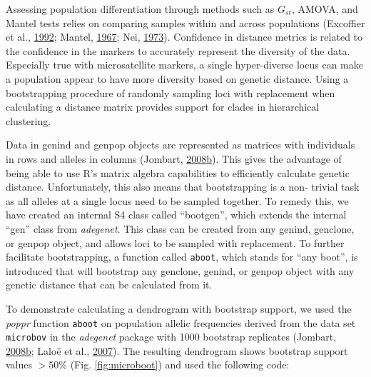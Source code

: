 \documentclass[double,12pt]{beavtex}
\begin{document}
  Assessing population differentiation through methods such as \(G_{st}\),
  AMOVA, and Mantel tests relies on comparing samples within and across
  populations (Excoffier et al.,
  \protect\hyperlink{ref-excoffier1992analysis}{1992}; Mantel,
  \protect\hyperlink{ref-mantel1967detection}{1967}; Nei,
  \protect\hyperlink{ref-nei1973analysis}{1973}). Confidence in distance
  metrics is related to the confidence in the markers to accurately
  represent the diversity of the data. Especially true with microsatellite
  markers, a single hyper-diverse locus can make a population appear to
  have more diversity based on genetic distance. Using a bootstrapping
  procedure of randomly sampling loci with replacement when calculating a
  distance matrix provides support for clades in hierarchical clustering.
  
  Data in genind and genpop objects are represented as matrices with
  individuals in rows and alleles in columns (Jombart,
  \protect\hyperlink{ref-Jombart_2008}{2008}\protect\hyperlink{ref-Jombart_2008}{b}).
  This gives the advantage of being able to use R's matrix algebra
  capabilities to efficiently calculate genetic distance. Unfortunately,
  this also means that bootstrapping is a non- trivial task as all alleles
  at a single locus need to be sampled together. To remedy this, we have
  created an internal S4 class called ``bootgen'', which extends the
  internal ``gen'' class from \emph{adegenet}. This class can be created
  from any genind, genclone, or genpop object, and allows loci to be
  sampled with replacement. To further facilitate bootstrapping, a
  function called \texttt{aboot}, which stands for ``any boot'', is
  introduced that will bootstrap any genclone, genind, or genpop object
  with any genetic distance that can be calculated from it.
  
  To demonstrate calculating a dendrogram with bootstrap support, we used
  the \emph{poppr} function \texttt{aboot} on population allelic
  frequencies derived from the data set \texttt{microbov} in the
  \emph{adegenet} package with 1000 bootstrap replicates (Jombart,
  \protect\hyperlink{ref-Jombart_2008}{2008}\protect\hyperlink{ref-Jombart_2008}{b};
  Laloë et al., \protect\hyperlink{ref-laloe2007consensus}{2007}). The
  resulting dendrogram shows bootstrap support values \(>50\%\) (Fig.
  \ref{fig:microboot}) and used the following code:
  
\end{document}
